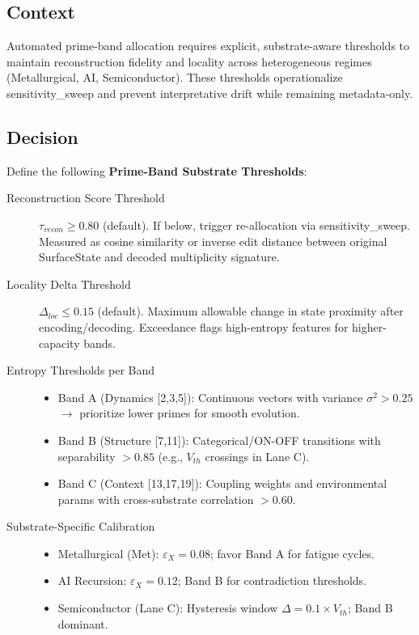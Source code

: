 \documentclass[11pt]{article}
\begin{document}
\subsection{Context}
Automated prime-band allocation requires explicit, substrate-aware thresholds to maintain reconstruction fidelity and locality across heterogeneous regimes (Metallurgical, AI, Semiconductor). These thresholds operationalize sensitivity_sweep and prevent interpretative drift while remaining metadata-only.

\subsection{Decision}
Define the following \textbf{Prime-Band Substrate Thresholds}:

\begin{description}
    \item[Reconstruction Score Threshold] $\tau_{recon} \geq 0.80$ (default). If below, trigger re-allocation via sensitivity_sweep. Measured as cosine similarity or inverse edit distance between original SurfaceState and decoded multiplicity signature.
    \item[Locality Delta Threshold] $\Delta_{loc} \leq 0.15$ (default). Maximum allowable change in state proximity after encoding/decoding. Exceedance flags high-entropy features for higher-capacity bands.
    \item[Entropy Thresholds per Band]
    \begin{itemize}
        \item Band A (Dynamics [2,3,5]): Continuous vectors with variance $\sigma^2 > 0.25$ $\to$ prioritize lower primes for smooth evolution.
        \item Band B (Structure [7,11]): Categorical/ON-OFF transitions with separability $> 0.85$ (e.g., $V_{th}$ crossings in Lane C).
        \item Band C (Context [13,17,19]): Coupling weights and environmental params with cross-substrate correlation $> 0.60$.
    \end{itemize}
    \item[Substrate-Specific Calibration]
    \begin{itemize}
        \item Metallurgical (Met): $\varepsilon_X = 0.08$; favor Band A for fatigue cycles.
        \item AI Recursion: $\varepsilon_X = 0.12$; Band B for contradiction thresholds.
        \item Semiconductor (Lane C): Hysteresis window $\Delta = 0.1 \times V_{th}$; Band B dominant.
    \end{itemize}
\end{description}
\end{document}
